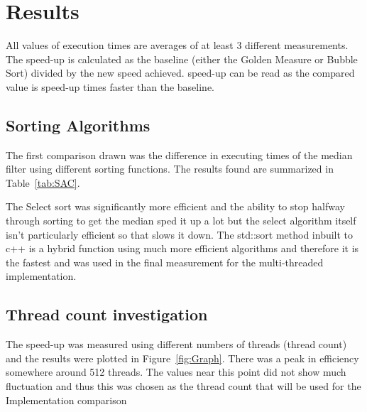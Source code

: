 \section{Results}

All values of execution times are averages of at least 3 different measurements. The speed-up is calculated as the baseline (either the Golden Measure or Bubble Sort) divided by the new speed achieved. speed-up can be read as the compared value is speed-up times faster than the baseline.

\subsection{Sorting Algorithms}

The first comparison drawn was the difference in executing times of the median filter using different sorting functions. The results found are summarized in Table~\ref{tab:SAC}.


The Select sort was significantly more efficient and the ability to stop halfway through sorting to get the median sped it up a lot but the select algorithm itself isn't particularly efficient so that slows it down.
The std::sort method inbuilt to c++ is a hybrid function using much more efficient algorithms and therefore it is the fastest and was used in the final measurement for the multi-threaded implementation. 

\subsection{Thread count investigation}
The speed-up was measured using different numbers of threads (thread count) and the results were plotted in Figure~\ref{fig:Graph}. There was a peak in efficiency somewhere around 512 threads. The values near this point did not show much fluctuation and thus this was chosen as the thread count that will be used for the Implementation comparison


